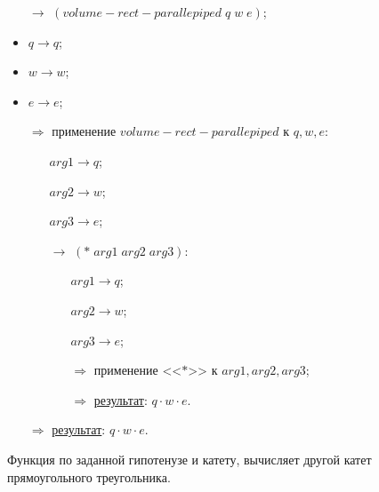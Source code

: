 \begin{itemize}
	\item[$\longrightarrow$] $(volume\!-\!rect\!-\!parallepiped\; q\; w\; e)$;
	\item $q \to q$;
	\item $w \to w$;
	\item $e \to e$;
	\item[$\Longrightarrow$] применение $volume\!-\!rect\!-\!parallepiped$ к $q, w, e$:
	\begin{itemize}
		\item[\textbullet] $arg1 \to q$;
		\item[\textbullet] $arg2 \to w$;
		\item[\textbullet] $arg3 \to e$;
		\item[$\longrightarrow$] $(*\; arg1\; arg2\; arg3)$:
		\begin{itemize}
			\item[\textbullet] $arg1 \to q$;
			\item[\textbullet] $arg2 \to w$;
			\item[\textbullet] $arg3 \to e$;
			\item[$\Longrightarrow$] применение <<$*$>> к $arg1, arg2, arg3$;
			\item[$\Longrightarrow$] \underline{результат}: $q \cdot w \cdot e$.
		\end{itemize}
	\end{itemize}
	\item[$\Longrightarrow$] \underline{результат}: $q \cdot w \cdot e$.
\end{itemize}


\problem Функция по заданной гипотенузе и катету, вычисляет другой катет прямоугольного треугольника.


